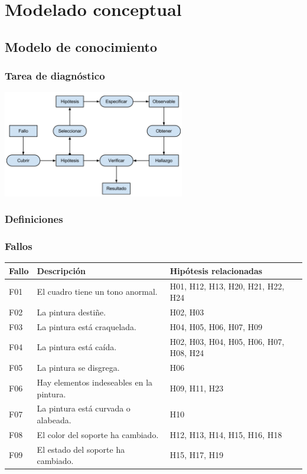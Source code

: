 \documentclass[a4paper,11pt]{article}
\begin{document}
	\section{Modelado conceptual}
		\subsection{Modelo de conocimiento}
			\subsubsection{Tarea de diagnóstico}
			\includegraphics[width=300px]{diagnostico.png} \\
			\subsubsection{Definiciones}
			\subsubsection{Fallos}
			\begin{center}
				\begin{tabular}{| p{2cm} | p{6cm} | p{3cm} |}
					\hline
					\cellcolor[RGB]{224,233,250}\textbf{Fallo} &
					\cellcolor[RGB]{224,233,250}\textbf{Descripción} &
					\cellcolor[RGB]{224,233,250}\textbf{Hipótesis relacionadas}\\
					\hline
					F01 & El cuadro tiene un tono anormal. & H01, H12, H13, H20, H21, H22,
					H24\\
					\hline
					F02 & La pintura destiñe. & H02, H03\\
					\hline
					F03 & La pintura está craquelada. &
					H04, H05, H06, H07, H09\\
					\hline
					F04 & La pintura está caída. &
					H02, H03, H04, H05, H06, H07, H08, H24\\
					\hline
					F05 & La pintura se disgrega. & H06\\
					\hline
					F06 & Hay elementos indeseables en la pintura. &
					H09, H11, H23\\
					\hline
					F07 & La pintura está curvada o alabeada. & H10\\
					\hline
					F08 & El color del soporte ha cambiado. &
					H12, H13, H14, H15, H16, H18\\
					\hline
					F09 & El estado del soporte ha cambiado. & H15, H17, H19\\
					\hline
				\end{tabular}
			\end{center}
			\newpage
\end{document}
